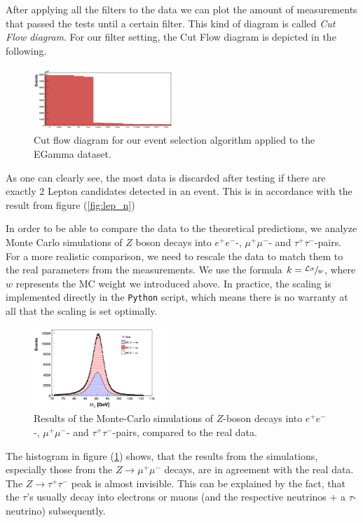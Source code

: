 \documentclass[twocolumn,
			   showpacs,%
               nofootinbib,
               aps,%
               prd,
               notitlepage,
               showkeys,
               10pt]{revtex4-1}
\begin{document}
After applying all the filters to the data we can plot the amount of measurements that passed the tests until a certain  filter. This kind of diagram is called \textit{Cut Flow diagram}. For our filter setting, the Cut Flow diagram is depicted in the following.

\begin{figure}[H]
\centering
\includegraphics[width = 0.5\textwidth]
{figures/plots/CutFlowEGamma_corr}
\caption{Cut flow diagram for our event selection algorithm applied to the EGamma dataset.}	
\end{figure}
As one can clearly see, the most data is discarded after testing if there are exactly 2 Lepton candidates detected in an event. This is in accordance with the result from figure (\ref{fig:lep_n})

In order to be able to compare the data to the theoretical predictions, we analyze Monte Carlo simulations of $Z$ boson decays into $e^+e^-$-, $\mu^+\mu^-$- and $\tau^+\tau^-$-pairs. \\
For a more realistic comparison, we need to rescale the data to match them to the real parameters from the measurements. We use the formula $k = \sfrac{\mathcal{L}\sigma}{w}$, where $w$ represents the MC weight we introduced above. In practice, the scaling is implemented directly in the \verb|Python| script, which means there is no warranty at all that the scaling is set optimally. \\
\begin{figure}[H]
	\centering
	\includegraphics[width=0.45\textwidth]{figures/plots/HistoMCData_corr}
	\caption{Results of the Monte-Carlo simulations of $Z$-boson decays into $e^+e^-$-, $\mu^+\mu^-$- and $\tau^+\tau^-$-pairs, compared to the real data.}
	\label{fig:MChisto}
\end{figure}
The histogram in figure (\ref{fig:MChisto}) shows, that the results from the simulations, especially those from the $Z\rightarrow \mu^+\mu^-$ decays, are in agreement with the real data. The $Z\rightarrow \tau^+\tau^-$ peak is almost invisible. This can be explained by the fact, that the $\tau$'s usually decay into electrons or muons (and the respective neutrinos + a $\tau$-neutrino) subsequently.
\end{document}
